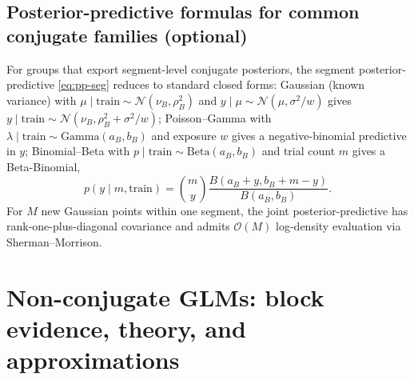 \subsection{Posterior-predictive formulas for common conjugate families (optional)}
\label{sec:families-predictive}
For groups that export segment-level conjugate posteriors, the segment posterior-predictive
\eqref{eq:pp-seg} reduces to standard closed forms: Gaussian (known variance) with
$\mu\mid\text{train}\sim\mathcal{N}(\nu_B,\rho_B^2)$ and $y\mid\mu\sim\mathcal{N}(\mu,\sigma^2/w)$
gives $y\mid\text{train}\sim\mathcal{N}(\nu_B,\rho_B^2+\sigma^2/w)$; Poisson--Gamma with
$\lambda\mid\text{train}\sim\mathrm{Gamma}(a_B,b_B)$ and exposure $w$ gives a negative-binomial
predictive in $y$; Binomial--Beta with $p\mid\text{train}\sim\mathrm{Beta}(a_B,b_B)$ and trial
count $m$ gives a Beta-Binomial,
\[
p(y\mid m,\text{train})=\binom{m}{y}\frac{B(a_B+y,b_B+m-y)}{B(a_B,b_B)}.
\]
For $M$ new Gaussian points within one segment, the joint posterior-predictive has
rank-one-plus-diagonal covariance and admits $\mathcal{O}(M)$ log-density evaluation via
Sherman--Morrison.

\section{Non-conjugate GLMs: block evidence, theory, and approximations}
\label{sec:nonconj}

